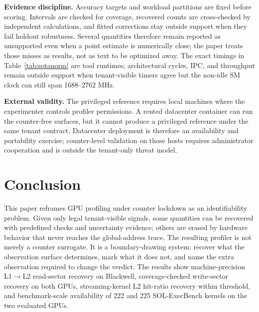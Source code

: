 \documentclass[conference]{IEEEtran}
\begin{document}
\textbf{Evidence discipline.} Accuracy targets and workload partitions are fixed
before scoring. Intervals are checked for coverage, recovered counts are
cross-checked by independent calculations, and fitted corrections stay outside
support when they fail holdout robustness. Several quantities therefore remain
reported as unsupported even when a point estimate is numerically close; the
paper treats those misses as results, not as text to be optimized away.
The exact timings in Table~\ref{tab:sotanorm} are tool runtimes; architectural
cycles, IPC, and throughput remain outside support when tenant-visible timers
agree but the non-idle SM clock can still span 1688--2762 MHz.

\textbf{External validity.} The privileged reference requires local machines
where the experimenter controls profiler permissions. A rented datacenter
container can run the counter-free surfaces, but it cannot produce a privileged
reference under the same tenant contract. Datacenter deployment is therefore an
availability and portability exercise; counter-level validation on those hosts
requires administrator cooperation and is outside the tenant-only threat model.

\section{Conclusion}

This paper reframes GPU profiling under counter lockdown as an identifiability
problem. Given only legal tenant-visible signals, some quantities can be
recovered with predefined checks and uncertainty evidence; others are erased by
hardware behavior that never reaches the global-address trace. The resulting
profiler is not merely a counter surrogate. It is a boundary-drawing system:
recover what the observation surface determines, mark what it does not, and
name the extra observation required to change the verdict. The results show
machine-precision L1$\rightarrow$L2 read-sector recovery on Blackwell,
coverage-checked write-sector recovery on both GPUs, streaming-kernel L2
hit-ratio recovery within threshold, and benchmark-scale availability of
222 and 225 SOL-ExecBench kernels on the two evaluated GPUs.

\providecommand{\BIBdecl}{}
\renewcommand{\BIBdecl}{\fontsize{7.75}{8.35}\selectfont}


\end{document}
